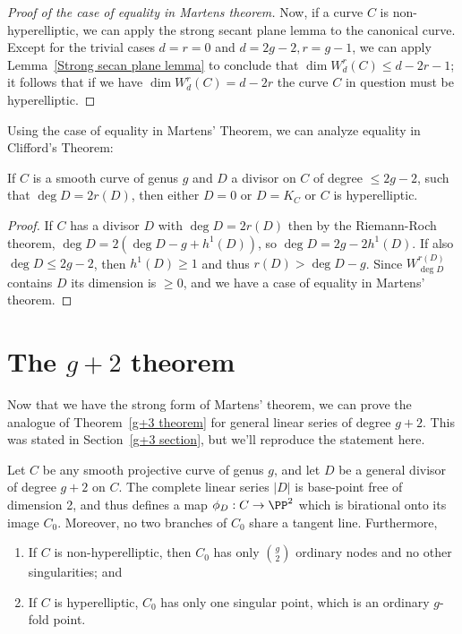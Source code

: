 \begin{proof}[Proof of the case of equality in Martens theorem]
 Now, if a curve $C$ is non-hyperelliptic, we can apply the strong secant plane lemma to the canonical curve. Except for the trivial cases $d=r=0$ and $d=2g-2, r=g-1$,
 we can apply Lemma~\ref{Strong secan plane lemma} to conclude that $\dim W^r_d(C) \leq d-2r-1$; it follows that if we have $\dim W^r_d(C) = d-2r$ the curve $C$ in question must be hyperelliptic.
\end{proof}

Using the case of equality in Martens' Theorem, we can analyze equality in 
Clifford's Theorem:

\begin{corollary}\label{equality in Clifford from Martens}
If $C$ is a smooth curve of genus $g$ and $D$ a divisor on $C$ of degree $\leq 2g-2$,
such that $\deg D = 2r(D)$, then either $D =0$ or $D=K_C$ or $C$ is hyperelliptic.
\end{corollary}

\begin{proof}
If $C$ has a divisor $D$ with $\deg D =2 r(D)$ then by the Riemann-Roch theorem,  $\deg D  = 2(\deg D-g+h^1(D))$, 
so $\deg D = 2g-2h^1(D)$. If also $\deg D\leq 2g-2$, then $h^1(D) \geq 1$
and thus $r(D) >\deg D-g$. Since $W^{r(D)}_{\deg D}$ contains $D$ its dimension
is $\geq 0$, and we have a case of equality in Martens' theorem.
\end{proof}

\section{The $g+2$ theorem}\label{g+2 section}

Now that we have the strong form of Martens' theorem, we can prove the analogue of Theorem~\ref{g+3 theorem} for general linear series of degree $g+2$. This was stated in Section~\ref{g+3 section}, but we'll reproduce the statement here.

\begin{theorem}
Let $C$ be any smooth projective curve of genus $g$, and let $D$ be a general divisor of degree $g+2$ on $C$. 
The complete linear series $|D|$ is base-point free of dimension 2, and thus defines a map $\phi_D: C\to \PP^2$
which is birational onto its image $C_0$. Moreover, no two branches of $C_0$ share a tangent line. Furthermore,

\begin{enumerate}
\item If $C$ is non-hyperelliptic, then $C_0$ has only $\binom{g}{2}$ ordinary nodes and no other singularities; and
\item If $C$ is hyperelliptic,  $C_0$ has only one singular point, which is an ordinary $g$-fold point.\end{enumerate}
\end{theorem}

